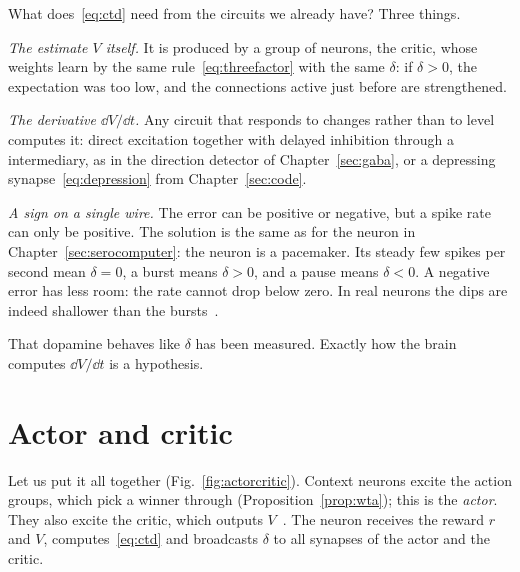 What does~\eqref{eq:ctd} need from the circuits we already have? Three things.

\emph{The estimate $V$ itself.} It is produced by a group of  neurons, the critic, whose weights learn by the same rule~\eqref{eq:threefactor} with the same $\delta$: if $\delta>0$, the expectation was too low, and the connections active just before are strengthened.

\emph{The derivative $\dd V/\dd t$.} Any circuit that responds to changes rather than to level computes it: direct excitation together with delayed inhibition through a  intermediary, as in the direction detector of Chapter~\ref{sec:gaba}, or a depressing synapse~\eqref{eq:depression} from Chapter~\ref{sec:code}.

\emph{A sign on a single wire.} The error can be positive or negative, but a spike rate can only be positive. The solution is the same as for the  neuron in Chapter~\ref{sec:serocomputer}: the  neuron is a pacemaker. Its steady few spikes per second mean $\delta=0$, a burst means $\delta>0$, and a pause means $\delta<0$. A negative error has less room: the rate cannot drop below zero. In real  neurons the dips are indeed shallower than the bursts~\cite{Bayer2005}.

That dopamine behaves like $\delta$ has been measured. Exactly how the brain computes $\dd V/\dd t$ is a hypothesis.

\section{Actor and critic}

Let us put it all together (Fig.~\ref{fig:actorcritic}). Context neurons excite the action groups, which pick a winner through  (Proposition~\ref{prop:wta}); this is the \emph{actor}. They also excite the critic, which outputs $V$~\cite{SuttonBarto2018}. The  neuron receives the reward $r$ and $V$, computes~\eqref{eq:ctd} and broadcasts $\delta$ to all synapses of the actor and the critic.

